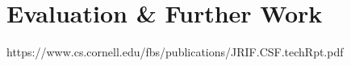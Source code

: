 \chapter{Evaluation \& Further Work}

https://www.cs.cornell.edu/fbs/publications/JRIF.CSF.techRpt.pdf